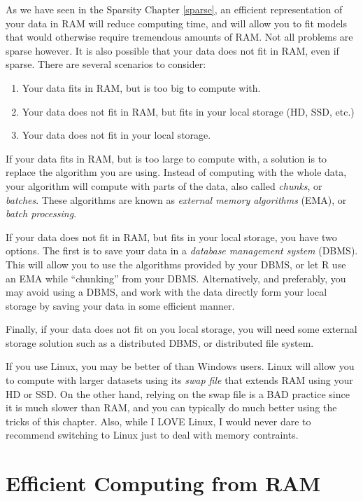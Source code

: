 \documentclass[]{book}
\providecommand{\tightlist}{%
  \setlength{\itemsep}{0pt}\setlength{\parskip}{0pt}}
\theoremstyle{definition}
\theoremstyle{definition}
\theoremstyle{definition}
\theoremstyle{remark}
\let\BeginKnitrBlock\begin \let\EndKnitrBlock\end
\begin{document}
As we have seen in the Sparsity Chapter \ref{sparse}, an efficient representation of your data in RAM will reduce computing time, and will allow you to fit models that would otherwise require tremendous amounts of RAM.
Not all problems are sparse however.
It is also possible that your data does not fit in RAM, even if sparse.
There are several scenarios to consider:

\begin{enumerate}
\def\labelenumi{\arabic{enumi}.}
\tightlist
\item
  Your data fits in RAM, but is too big to compute with.
\item
  Your data does not fit in RAM, but fits in your local storage (HD, SSD, etc.)
\item
  Your data does not fit in your local storage.
\end{enumerate}

If your data fits in RAM, but is too large to compute with, a solution is to replace the algorithm you are using.
Instead of computing with the whole data, your algorithm will compute with parts of the data, also called \emph{chunks}, or \emph{batches}.
These algorithms are known as \emph{external memory algorithms} (EMA), or \emph{batch processing}.

If your data does not fit in RAM, but fits in your local storage, you have two options.
The first is to save your data in a \emph{database management system} (DBMS).
This will allow you to use the algorithms provided by your DBMS, or let R use an EMA while ``chunking'' from your DBMS.
Alternatively, and preferably, you may avoid using a DBMS, and work with the data directly form your local storage by saving your data in some efficient manner.

Finally, if your data does not fit on you local storage, you will need some external storage solution such as a distributed DBMS, or distributed file system.

\BeginKnitrBlock{remark}
{}If you use Linux, you may be better of than Windows users.
Linux will allow you to compute with larger datasets using its \emph{swap file} that extends RAM using your HD or SSD.
On the other hand, relying on the swap file is a BAD practice since it is much slower than RAM, and you can typically do much better using the tricks of this chapter.
Also, while I LOVE Linux, I would never dare to recommend switching to Linux just to deal with memory contraints.
\EndKnitrBlock{remark}

\hypertarget{efficient-computing-from-ram}{%
\section{Efficient Computing from RAM}\label{efficient-computing-from-ram}}
\end{document}
